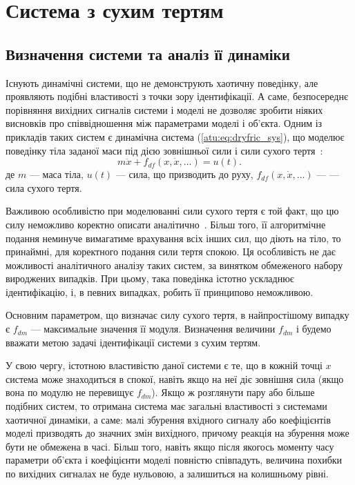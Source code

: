 
\FloatBarrier
\section{Система з сухим тертям} %
\label{atu:sect:fric}


\subsection{Визначення системи та аналіз її динаміки} %

Існують динамічні системи, що не демонструють хаотичну поведінку,
але проявляють подібні властивості з точки зору ідентифікації. А саме,
безпосереднє порівняння вихідних
сигналів системи і моделі не дозволяє зробити ніяких
висновків про співвідношення між параметрами моделі і об'єкта. Одним із
прикладів таких систем є динамічна система (\ref{atu:eq:dryfric_sys}), що
моделює поведінку тіла заданої маси під дією зовнішньої сили і сили
сухого тертя~\cite{berger_friction,osn_dyn_prom_robot,borcov}:
%
\begin{equation}
  m \ddot{x} + f_{df}( x, \dot{x}, \ldots)  = u(t).
\label{atu:eq:dryfric_sys}
\end{equation}
%
де
$m$ --- маса тіла,
$u(t)$ --- сила, що призводить до руху,
$ f_{df}( x, \dot{x}, \ldots)  $ ---  --- сила сухого тертя.

Важливою особливістю при моделюванні сили сухого тертя є той факт, що цю силу
неможливо коректно описати аналітично~\cite{atu_asau11}.
Більш того, її алгоритмічне подання неминуче вимагатиме
врахування всіх інших сил, що діють на тіло, то принаймні,
для коректного подання сили тертя спокою. Ця особливість не
дає можливості аналітичного аналізу таких систем, за винятком
обмеженого набору вироджених випадків. При цьому, така поведінка
істотно ускладнює ідентифікацію, і, в певних випадках, робить
її принципово неможливою.

Основним параметром, що визначає силу сухого тертя, в найпростішому
випадку є $f_{dm}$ --- максимальне значення її
модуля. Визначення величини  $f_{dm}$ і будемо вважати метою задачі ідентифікації
системи з сухим тертям.

У свою чергу, істотною властивістю даної системи є те, що в кожній
точці \(x\) система може знаходиться в спокої, навіть якщо на неї
діє зовнішня сила (якщо вона по модулю не перевищує $ f_{dm}$).
Якщо ж розглянути пару або більше подібних систем, то
отримана система має загальні властивості з системами хаотичної
динаміки, а саме: малі збурення вхідного сигналу або коефіцієнтів
моделі призводять до значних змін вихідного, причому реакція на
збурення може бути не обмежена в часі. Більш того, навіть якщо
після якогось моменту часу параметри об'єкта і коефіцієнти
моделі повністю співпадуть, величина похибки по вихідних сигналах не
буде нульовою, а залишиться на колишньому рівні.

